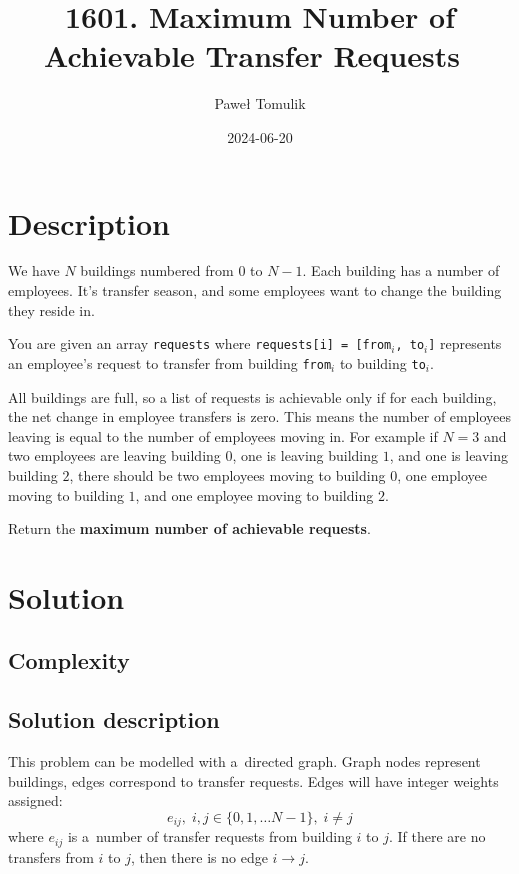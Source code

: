 \documentclass[paper=a4,parskip=half,DIV=12]{leetcode}
\begin{document}
\title{1601. Maximum Number of Achievable Transfer Requests~\cite{leetcode:1601}}
\subtitle{}
\author{Paweł Tomulik}
\date{2024-06-20}
\maketitle

\section{Description}
\label{sec:description}

We have $N$ buildings numbered from $0$ to $N - 1$. Each building has a number
of employees. It's transfer season, and some employees want to change the
building they reside in.

You are given an array \texttt{requests} where \texttt{requests[i] = [from$_i$,
to$_i$]} represents an employee's request to transfer from building
\texttt{from$_i$} to building \texttt{to$_i$}.

All buildings are full, so a list of requests is achievable only if for each
building, the net change in employee transfers is zero. This means the number
of employees leaving is equal to the number of employees moving in. For example
if $N = 3$ and two employees are leaving building $0$, one is leaving building
$1$, and one is leaving building $2$, there should be two employees moving to
building $0$, one employee moving to building $1$, and one employee moving to
building $2$.

Return the \textbf{maximum number of achievable requests}.

\section{Solution}
\label{sec:solution}

\subsection{Complexity}
\label{sec:complexity}

\subsection{Solution description}
\label{sec:solution-description}

This problem can be modelled with a~directed graph. Graph nodes represent
buildings, edges correspond to transfer requests. Edges will have integer
weights assigned:
\begin{equation}
    e_{ij}, \; i, j \in \{ 0, 1, \dots N-1 \}, \; i \neq j
    \label{eq:49EZ8}
\end{equation}
where $e_{ij}$ is a~number of transfer requests from building $i$ to $j$. If
there are no transfers from $i$ to $j$, then there is no edge $i \to j$.
\end{document}
